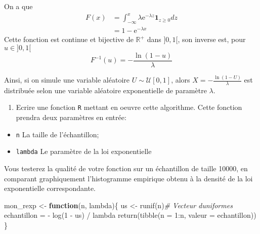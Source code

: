 \documentclass[
]{article}
\newenvironment{Shaded}{\begin{snugshade}}{\end{snugshade}}
\newcommand{\AttributeTok}[1]{\textcolor[rgb]{0.77,0.63,0.00}{#1}}
\newcommand{\CommentTok}[1]{\textcolor[rgb]{0.56,0.35,0.01}{\textit{#1}}}
\newcommand{\ControlFlowTok}[1]{\textcolor[rgb]{0.13,0.29,0.53}{\textbf{#1}}}
\newcommand{\DecValTok}[1]{\textcolor[rgb]{0.00,0.00,0.81}{#1}}
\newcommand{\FunctionTok}[1]{\textcolor[rgb]{0.00,0.00,0.00}{#1}}
\newcommand{\NormalTok}[1]{#1}
\newcommand{\OtherTok}[1]{\textcolor[rgb]{0.56,0.35,0.01}{#1}}
\newcommand{\SpecialCharTok}[1]{\textcolor[rgb]{0.00,0.00,0.00}{#1}}
\providecommand{\tightlist}{%
  \setlength{\itemsep}{0pt}\setlength{\parskip}{0pt}}
\newenvironment{Correction}%
  { \vspace{\baselineskip}\begin{mdframed}[backgroundcolor=my_green]}%
  {\end{mdframed}}
\begin{document}
\begin{Correction}

On a que
\begin{align*}
F(x) &= \int_\mathbb{-\infty}^x \lambda\text{e}^{-\lambda z} \mathbf{1}_{z\geq0} dz\\
&= 1 - \text{e}^{-\lambda x}
\end{align*}
Cette fonction est continue et bijective de $\mathbb{R^+}$ dans $]0,1[$, son inverse est, pour $u\in ]0, 1[$
$$F^{-1}(u) = -\frac{\ln (1 - u)}{\lambda}$$

Ainsi, si on simule une variable aléatoire $U\sim \mathcal{U}[0, 1]$, alors
$X = -\frac{\ln (1 - U)}{\lambda}$ est distribuée selon une variable aléatoire exponentielle de
paramètre $\lambda$.

\end{Correction}

\begin{enumerate}
\def\labelenumi{\arabic{enumi}.}
\setcounter{enumi}{1}
\tightlist
\item
  Ecrire une fonction \texttt{R} mettant en oeuvre cette algorithme.
  Cette fonction prendra deux paramètres en entrée:
\end{enumerate}

\begin{itemize}
\tightlist
\item
  \texttt{n} La taille de l'échantillon;
\item
  \texttt{lambda} Le paramètre de la loi exponentielle
\end{itemize}

Vous testerez la qualité de votre fonction sur un échantillon de taille
10000, en comparant graphiquement l'histogramme empirique obtenu à la
densité de la loi exponentielle correspondante.

\begin{Shaded}
\begin{Highlighting}[]
\NormalTok{mon\_rexp }\OtherTok{\textless{}{-}} \ControlFlowTok{function}\NormalTok{(n, lambda)\{}
\NormalTok{  us }\OtherTok{\textless{}{-}} \FunctionTok{runif}\NormalTok{(n)}\CommentTok{\# Vecteur d\textquotesingle{}uniformes}
\NormalTok{  echantillon }\OtherTok{=} \SpecialCharTok{{-}} \FunctionTok{log}\NormalTok{(}\DecValTok{1} \SpecialCharTok{{-}}\NormalTok{ us) }\SpecialCharTok{/}\NormalTok{ lambda}
  \FunctionTok{return}\NormalTok{(}\FunctionTok{tibble}\NormalTok{(}\AttributeTok{n =} \DecValTok{1}\SpecialCharTok{:}\NormalTok{n, }\AttributeTok{valeur =}\NormalTok{ echantillon))}
\NormalTok{\}}
\end{Highlighting}
\end{Shaded}
\end{document}
